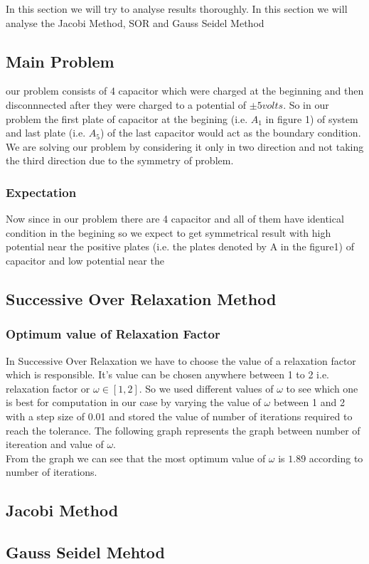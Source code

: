 In this section we will try to analyse  results thoroughly. In this section we will analyse the Jacobi Method, SOR  and Gauss Seidel Method  
\subsection{Main Problem}
our problem consists of 4 capacitor which were charged at the beginning and then disconnnected after they were charged  to a potential of $ \pm5 volts$. So in our problem the first plate of capacitor at the begining {(i.e. $A_{1}$ in figure 1) }of system and last plate {(i.e. $A_5$)} of the last capacitor  would act as the boundary condition. We are solving our problem by considering it only in two direction and not taking the third direction due to the symmetry of problem.
\subsubsection*{Expectation}
Now since in our problem there are 4 capacitor and all of them have identical condition in the begining so we expect to get symmetrical result with high potential near the positive plates (i.e. the plates denoted by A  in the figure1) of capacitor and low potential near the 
\subsection{Successive Over Relaxation Method}
\subsubsection*{Optimum value of Relaxation Factor}
In Successive Over Relaxation we have to choose the value of a relaxation factor which is responsible. It's value can be chosen anywhere between 1 to 2 i.e. relaxation factor or $ \omega  \in [1,2] $. So we used different values of $ \omega $ to see which one is best for computation in our case by varying the value of $\omega$ between 1 and 2 with a step size of 0.01 and stored the value of number of iterations  required to reach the tolerance. The following graph represents the graph between number of itereation and value of $ \omega $. \\
From the graph we can see that the most optimum value of $ \omega $ is $1.89$ according to number of iterations.
\subsection{Jacobi Method}
\subsection{Gauss Seidel Mehtod} 
